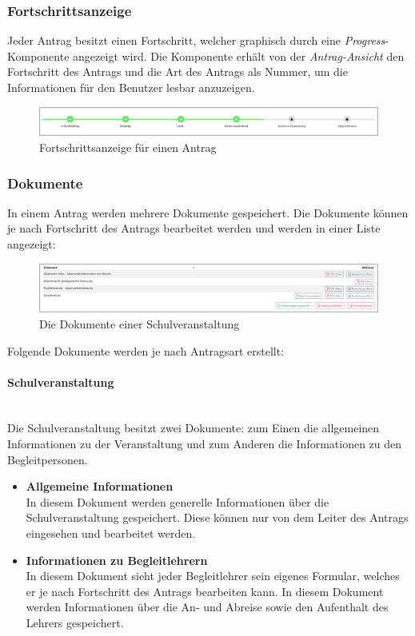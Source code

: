 \subsubsection{Fortschrittsanzeige}
Jeder Antrag besitzt einen Fortschritt, welcher graphisch durch eine \textit{Progress}-Komponente angezeigt wird. Die Komponente erhält von der \textit{Antrag-Ansicht} den Fortschritt des Antrags und die Art des Antrags als Nummer, um die Informationen für den Benutzer lesbar anzuzeigen.
\begin{figure}
	\centering
	\includegraphics[width=1\linewidth]{images/rfoster_implementierung/progress}
	\caption[Fortschrittsanzeige]{Fortschrittsanzeige für einen Antrag}
	\label{fig:progress}
\end{figure}
\subsubsection{Dokumente}
In einem Antrag werden mehrere Dokumente gespeichert. Die Dokumente können je nach Fortschritt des Antrags bearbeitet werden und werden in einer Liste angezeigt:
\begin{figure}
	\centering
	\includegraphics[width=1\linewidth]{images/rfoster_implementierung/documents}
	\caption[Dokumente eines Antrags]{Die Dokumente einer Schulveranstaltung}
	\label{fig:documents}
\end{figure}

Folgende Dokumente werden je nach Antragsart erstellt:
\paragraph{Schulveranstaltung}~\\
Die Schulveranstaltung besitzt zwei Dokumente: zum Einen die allgemeinen Informationen zu der Veranstaltung und zum Anderen die Informationen zu den Begleitpersonen.
\begin{itemize}
	\item \textbf{Allgemeine Informationen}\\
	In diesem Dokument werden generelle Informationen über die Schulveranstaltung gespeichert. Diese können nur von dem Leiter des Antrags eingesehen und bearbeitet werden.
	\item \textbf{Informationen zu Begleitlehrern}\\
	In diesem Dokument sieht jeder Begleitlehrer sein eigenes Formular, welches er je nach Fortschritt des Antrags bearbeiten kann. In diesem Dokument werden Informationen über die An- und Abreise sowie den Aufenthalt des Lehrers gespeichert.
\end{itemize}
\newpage~
